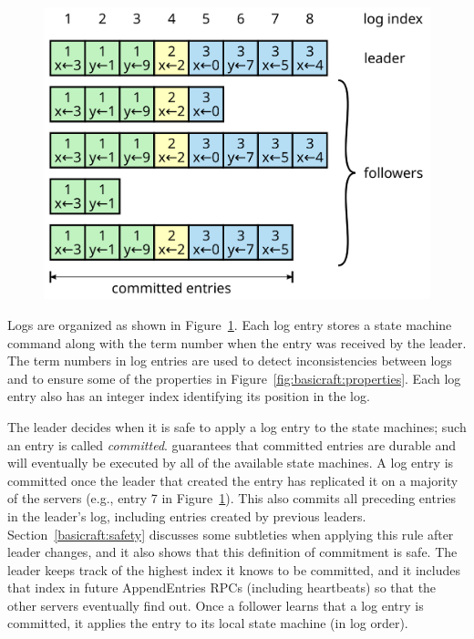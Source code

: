 \begin{figure}
\centering
\includegraphics[scale=.50]{basicraft/log2}
\label{fig:basicraft:log}
\end{figure}

Logs are organized as shown in Figure~\ref{fig:basicraft:log}.
Each log entry stores a state machine command along with the
term number when the entry was received by the leader.
The term numbers in log entries are used to detect inconsistencies
between logs and to ensure some of the properties in
Figure~\ref{fig:basicraft:properties}. Each log entry
also has an integer index identifying its position in the log.

The leader decides when it is safe to apply a log entry to the
state machines; such an entry is called \emph{committed}.
\name{} guarantees that committed entries are durable
and will eventually be executed by all of the available state machines.
A log entry is committed once the leader that created the
entry has replicated it on a majority of the servers
(e.g., entry 7 in Figure~\ref{fig:basicraft:log}). 
This also commits all preceding entries in the leader's log, including
entries created by previous leaders.
Section~\ref{basicraft:safety} discusses some subtleties when applying
this rule after leader changes, and it also shows
that this definition of commitment is safe.
The leader keeps track of the highest index
it knows to be committed, and it includes
that index in future AppendEntries RPCs (including heartbeats) so
that the other servers eventually find out. Once a follower
learns that a log entry is committed, it applies the entry
to its local state machine (in log order).

